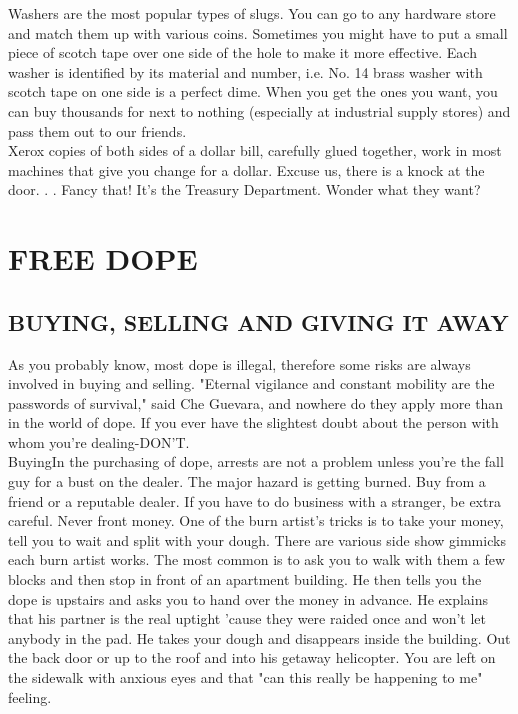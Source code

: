 \documentclass[11pt,twoside,a4paper]{book}
\begin{document}
Washers are the most popular types of slugs. You can go to any hardware store and match them up with various coins. Sometimes you might have to put a small piece of scotch tape over one side of the hole to make it more effective. Each washer is identified by its material and number, i.e. No. 14 brass washer with scotch tape on one side is a perfect dime. When you get the ones you want, you can buy thousands for next to nothing (especially at industrial supply stores) and pass them out to our friends.~\\

Xerox copies of both sides of a dollar bill, carefully glued together, work in most machines that give you change for a dollar. Excuse us, there is a knock at the door. . . Fancy that! It's the Treasury Department. Wonder what they want?

\section{FREE DOPE}

\subsection{BUYING, SELLING AND GIVING IT AWAY}

As you probably know, most dope is illegal, therefore some risks are always involved in buying and selling. "Eternal vigilance and constant mobility are the passwords of survival," said Che Guevara, and nowhere do they apply more than in the world of dope. If you ever have the slightest doubt about the person with whom you're dealing-DON'T.~\\

BuyingIn the purchasing of dope, arrests are not a problem unless you're the fall guy for a bust on the dealer. The major hazard is getting burned. Buy from a friend or a reputable dealer. If you have to do business with a stranger, be extra careful. Never front money. One of the burn artist's tricks is to take your money, tell you to wait and split with your dough. There are various side show gimmicks each burn artist works. The most common is to ask you to walk with them a few blocks and then stop in front of an apartment building. He then tells you the dope is upstairs and asks you to hand over the money in advance. He explains that his partner is the real uptight 'cause they were raided once and won't let anybody in the pad. He takes your dough and disappears inside the building. Out the back door or up to the roof and into his getaway helicopter. You are left on the sidewalk with anxious eyes and that "can this really be happening to me" feeling.~\\
\end{document}
